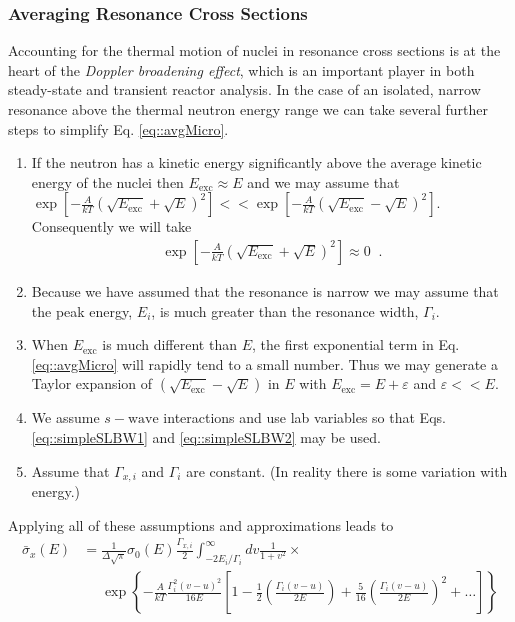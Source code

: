 \documentclass[11pt]{article}
\begin{document}
\subsubsection{Averaging Resonance Cross Sections}
\label{sec:orgheadline19}
Accounting for the thermal motion of nuclei in resonance cross sections is at the heart of the \emph{Doppler broadening effect}, which is an important player in both steady-state and transient reactor analysis.  In the case of an isolated, narrow resonance above the thermal neutron energy range we can take several further steps to simplify Eq. \eqref{eq::avgMicro}.
\begin{enumerate}
\item If the neutron has a kinetic energy significantly above the average kinetic energy of the nuclei then \(E_\text{exc} \approx E\) and we may assume that \(\exp\left[-\frac{A}{kT}\left(\sqrt{E_\text{exc}} + \sqrt{E}\right)^2\right] << \exp\left[-\frac{A}{kT}\left(\sqrt{E_\text{exc}} - \sqrt{E}\right)^2\right]\).  Consequently we will take
\begin{align}
  \exp\left[-\frac{A}{kT}\left(\sqrt{E_\text{exc}} + \sqrt{E}\right)^2\right] \approx 0 \;\;.
\end{align}
\item Because we have assumed that the resonance is narrow we may assume that the peak energy, \(E_i\), is much greater than the resonance width, \(\Gamma_i\).
\item When \(E_\text{exc}\) is much different than \(E\), the first exponential term in Eq. \eqref{eq::avgMicro} will rapidly tend to a small number.  Thus we may generate a Taylor expansion of \(\left(\sqrt{E_\text{exc}} - \sqrt{E}\right)\) in \(E\) with \(E_\text{exc} = E + \varepsilon\) and \(\varepsilon << E\).
\item We assume \(s-\text{wave}\) interactions and use lab variables so that Eqs. \eqref{eq::simpleSLBW1} and \eqref{eq::simpleSLBW2} may be used.
\item Assume that \(\Gamma_{x,i}\) and \(\Gamma_i\) are constant.  (In reality there is some variation with energy.)
\end{enumerate}
Applying all of these assumptions and approximations leads to
\begin{align}
  \label{eq::dopplerSLBWx}
  \bar{\sigma}_x(E) &= \frac{1}{\Delta \sqrt{\pi}} \sigma_0(E) \frac{\Gamma_{x,i}}{2}
                      \int_{-2E_i/\Gamma_i}^\infty dv \frac{1}{1+v^2} \times \\
                    &\phantom{=}  \exp\left\{ -\frac{A}{kT} \frac{\Gamma_i^2(v-u)^2}{16E}
                                  \left[ 1 - \frac{1}{2}\left( \frac{\Gamma_i(v-u)}{2E} \right)
                                           + \frac{5}{16}\left( \frac{\Gamma_i(v-u)}{2E} \right)^2 + \hdots \right] \right\}
\end{align}
\end{document}
